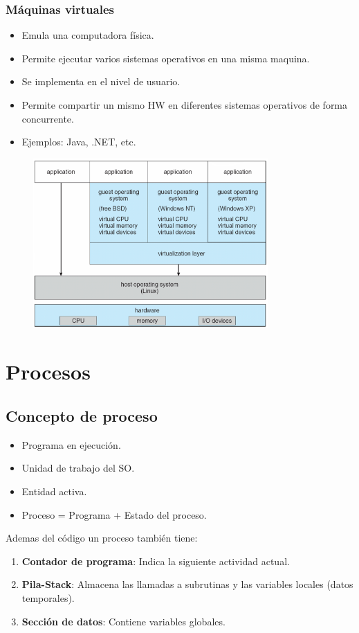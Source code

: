 \documentclass{templateNote}
\begin{document}
\subsubsection*{Máquinas virtuales}
\begin{itemize}
    \item Emula una computadora física.
    \item Permite ejecutar varios sistemas operativos en una misma maquina.
    \item Se implementa en el nivel de usuario.
    \item Permite compartir un mismo HW en diferentes sistemas operativos de forma concurrente.
    \item Ejemplos: Java, .NET, etc.
\end{itemize}

\begin{figure}[H]
    \centering
    \includegraphics[width=0.8\textwidth]{img/estMaq.png}
\end{figure}

\newpage
\section*{Procesos}

\subsection*{Concepto de proceso}
\begin{itemize}
    \item Programa en ejecución.
    \item Unidad de trabajo del SO.
    \item Entidad activa.
    \item Proceso = Programa + Estado del proceso.
\end{itemize}
Ademas del código un proceso también tiene:
\begin{enumerate}
    \item \textbf{Contador de programa}: Indica la siguiente actividad actual.
    \item \textbf{Pila-Stack}: Almacena las llamadas a subrutinas y las variables locales (datos temporales).
    \item \textbf{Sección de datos}: Contiene variables globales.
\end{enumerate}
\end{document}
